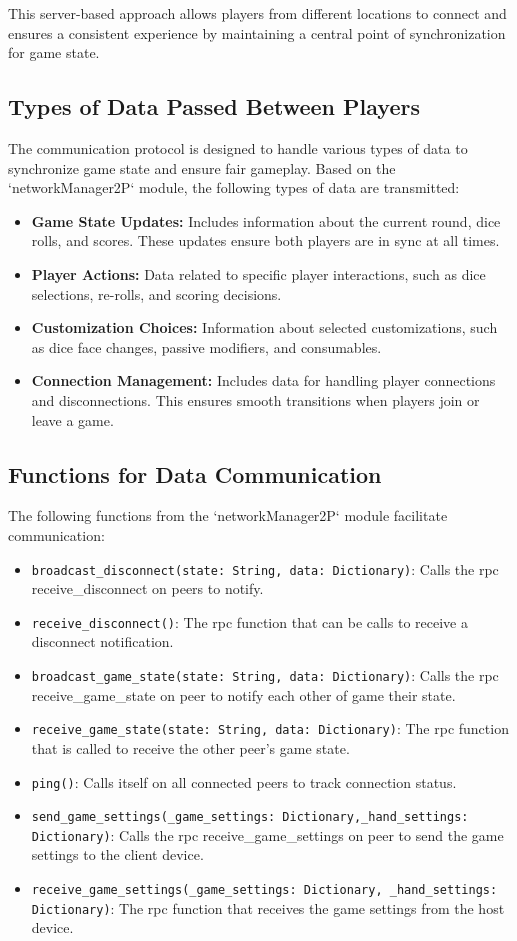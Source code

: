 \documentclass[12pt, titlepage]{article}
\begin{document}
This server-based approach allows players from different locations to connect and ensures a consistent experience by maintaining a central point of synchronization for game state.

\subsection{Types of Data Passed Between Players}

The communication protocol is designed to handle various types of data to synchronize game state and ensure fair gameplay. Based on the `networkManager2P` module, the following types of data are transmitted:
\begin{itemize}
    \item \textbf{Game State Updates:} Includes information about the current round, dice rolls, and scores. These updates ensure both players are in sync at all times.
    \item \textbf{Player Actions:} Data related to specific player interactions, such as dice selections, re-rolls, and scoring decisions.
    \item \textbf{Customization Choices:} Information about selected customizations, such as dice face changes, passive modifiers, and consumables.
    \item \textbf{Connection Management:} Includes data for handling player connections and disconnections. This ensures smooth transitions when players join or leave a game.
\end{itemize}

\subsection{Functions for Data Communication}

The following functions from the `networkManager2P` module facilitate communication:
\begin{itemize}
    \item \texttt{broadcast\_disconnect(state: String, data: Dictionary)}: Calls the rpc receive\_disconnect on peers to notify.
    \item \texttt{receive\_disconnect()}: The rpc function that can be calls to receive a disconnect notification.
    \item \texttt{broadcast\_game\_state(state: String, data: Dictionary)}: Calls the rpc receive\_game\_state on peer to notify each other of game their state.
    \item \texttt{receive\_game\_state(state: String, data: Dictionary)}: The rpc function that is called to receive the other peer's game state.
    \item \texttt{ping()}: Calls itself on all connected peers to track connection status.
    \item \texttt{send\_game\_settings(\_game\_settings: Dictionary,\_hand\_settings: Dictionary)}: Calls the rpc receive\_game\_settings on peer to send the game settings to the client device.
    \item \texttt{receive\_game\_settings(\_game\_settings: Dictionary, \_hand\_settings: Dictionary)}: The rpc function that receives the game settings from the host device.
\end{itemize}
\end{document}
